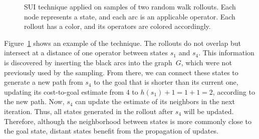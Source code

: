 \begin{figure}[ht]
    \caption[SUI technique applied on samples of random walk rollouts.]{SUI technique applied on samples of two random walk rollouts. Each node represents a state, and each arc is an applicable operator. Each rollout has a color, and its operators are colored accordingly.}
    \label{fig:sui}
    \addvspace{\baselineskip}
    \centering
\end{figure}

Figure~\ref{fig:sui} shows an example of the technique. The rollouts do not overlap but intersect at a distance of one operator between states $s_1$ and $s_4$. This information is discovered by inserting the black arcs into the graph~$G$, which were not previously used by the sampling. From there, we can connect these states to generate a new path from $s_4$ to the goal that is shorter than its current one, updating its cost-to-goal estimate from $4$ to $h(s_1)+1=1+1=2$, according to the new path. Now, $s_4$ can update the estimate of its neighbors in the next iteration. Thus, all states generated in the rollout after $s_4$ will be updated. Therefore, although the neighborhood between states is more commonly close to the goal state, distant states benefit from the propagation of updates.

